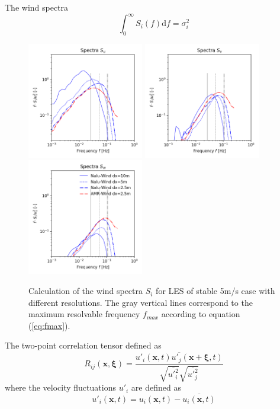 The wind spectra
\begin{equation}
  \int_0^\infty S_i(f) \textrm{d}f = \sigma_i^2
\end{equation}

\begin{figure}[hbt!]
  \label{fig:GridStudySpectra}
  \centering
  \includegraphics[width=2.0in]{figures/GridStudy_Spectra_Su.png}
  \includegraphics[width=2.0in]{figures/GridStudy_Spectra_Sv.png}
  \includegraphics[width=2.0in]{figures/GridStudy_Spectra_Sw.png}
  \caption{Calculation of the wind spectra $S_i$ for LES of stable
    5m/s case with different resolutions.  The gray vertical lines
    correspond to the maximum resolvable frequency $f_{max}$ according
    to equation (\ref{eq:fmax}). }
\end{figure}

The two-point correlation tensor defined as
\begin{equation}
  \label{eq:Rij}
  R_{ij}({\mathbf x},\boldsymbol{\xi}) = 
  \frac{\overline{ {u'_i(\mathbf{x}, t) u'_j(\mathbf{x}+\boldsymbol{\xi},t)} }}
       { \sqrt{\overline{ u'^2_i }} \sqrt{\overline{ u'^2_j}} }
\end{equation}
where the velocity fluctuations $u'_i$ are defined as 
\begin{equation}
  u'_i(\mathbf{x},t) = u_i(\mathbf{x},t) - \overline{ u_i(\mathbf{x},t) }
\end{equation}


